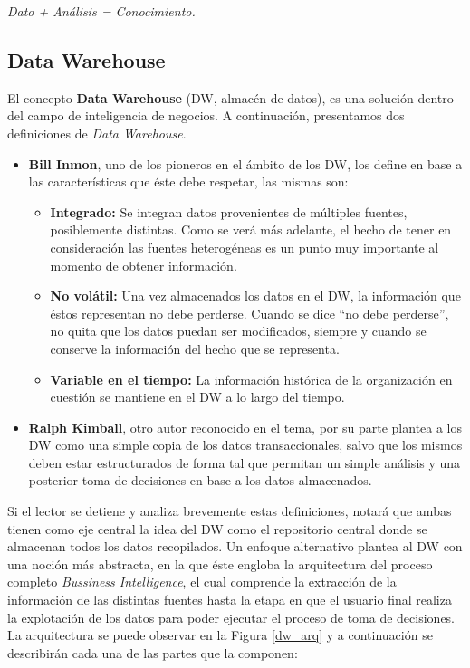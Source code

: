 \documentclass[a4paper,11pt]{article}
\begin{document}
    \begin{center}
      \textit{Dato + Análisis = Conocimiento.}
    \end{center}


    \subsection{Data Warehouse}
    
    El concepto \textbf{Data Warehouse} (DW, almacén de datos), es una solución dentro del campo de inteligencia de negocios.
    A continuación, presentamos dos definiciones de \textit{Data Warehouse}.

    \begin{itemize}
      \item \textbf{Bill Inmon}, uno de los pioneros en el ámbito de los DW, los define en base a las características que éste debe respetar, las mismas son:
      \begin{itemize}
        \item \textbf{Integrado:} Se integran datos provenientes de múltiples fuentes, posiblemente distintas. Como se verá más adelante, el hecho de tener
        en consideración las fuentes heterogéneas es un punto muy importante al momento de obtener información.
        \item \textbf{No volátil:} Una vez almacenados los datos en el DW, la información que éstos representan no debe perderse. Cuando se dice
        ``no debe perderse'', no quita que los datos puedan ser modificados, siempre y cuando se conserve la información del hecho que se representa.
        \item \textbf{Variable en el tiempo:} La información histórica de la organización en cuestión se mantiene en el DW a lo largo del tiempo.
      \end{itemize}
      \item \textbf{Ralph Kimball}, otro autor reconocido en el tema, por su parte plantea a los DW como una simple copia de los datos transaccionales,
      salvo que los mismos deben estar estructurados de forma tal que permitan un simple análisis y una posterior toma de decisiones en base a los
      datos almacenados.
    \end{itemize}
    
    Si el lector se detiene y analiza brevemente estas definiciones, notará que ambas tienen como eje central la idea del DW como el repositorio central
    donde se almacenan todos los datos recopilados. Un enfoque alternativo plantea al DW con una noción más abstracta, en la que éste engloba
    la arquitectura del proceso completo \textit{Bussiness Intelligence}, el cual comprende la
    extracción de la información de las distintas fuentes hasta la etapa en que el usuario final realiza la explotación de los datos para poder ejecutar el
    proceso de toma de decisiones. La arquitectura se puede observar en la Figura \ref{dw_arq} y a continuación se describirán cada
    una de las partes que la componen:
\end{document}
